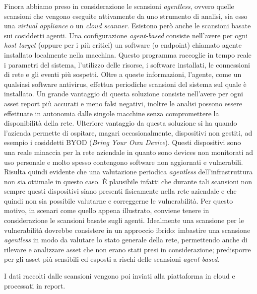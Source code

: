 \documentclass[target=bach,aauheader=]{thud}
\begin{document}
Finora abbiamo preso in considerazione le scansioni \textit{agentless}, ovvero quelle scansioni che vengono eseguite attivamente da uno strumento di analisi, sia esso una \textit{virtual appliance} o un \textit{cloud scanner}. Esistono però anche le scansioni basate sui cosiddetti agenti. Una configurazione \textit{agent-based} consiste nell’avere per ogni \textit{host target} (oppure per i più critici) un software (o endpoint) chiamato agente installato localmente nella macchina. Questo programma raccoglie in tempo reale i parametri del sistema, l’utilizzo delle risorse, i software installati, le connessioni di rete e gli eventi più sospetti. Oltre a queste informazioni, l’agente, come un qualsiasi software antivirus, effettua periodiche scansioni del sistema sul quale è installato. Un grande vantaggio di questa soluzione consiste nell’avere per ogni asset report più accurati e meno falsi negativi, inoltre le analisi possono essere effettuate in autonomia dalle singole macchine senza compromettere la disponibilità della rete. Ulteriore vantaggio da questa soluzione si ha quando l’azienda permette di ospitare, magari occasionalmente, dispositivi non gestiti, ad esempio i cosiddetti BYOD (\textit{Bring Your Own Device}). Questi dispositivi sono una reale minaccia per la rete aziendale in quanto sono devices non monitorati ad uso personale e molto spesso contengono software non aggiornati e vulnerabili. Risulta quindi evidente che una valutazione periodica \textit{agentless} dell’infrastruttura non sia ottimale in questo caso. È plausibile infatti che durante tali scansioni non sempre questi dispositivi siano presenti fisicamente nella rete aziendale e che quindi non sia possibile valutarne e correggerne le vulnerabilità. Per questo motivo, in scenari come quello appena illustrato, conviene tenere in considerazione le scansioni basate sugli agenti. Idealmente una scansione per le vulnerabilità dovrebbe consistere in un approccio ibrido: imbastire una scansione \textit{agentless} in modo da valutare lo stato generale della rete, permettendo anche di rilevare e analizzare asset che non erano stati presi in considerazione; predisporre per gli asset più sensibili ed esposti a rischi delle scansioni \textit{agent-based}.

I dati raccolti dalle scansioni vengono poi inviati alla piattaforma in cloud e processati in report.
\end{document}
